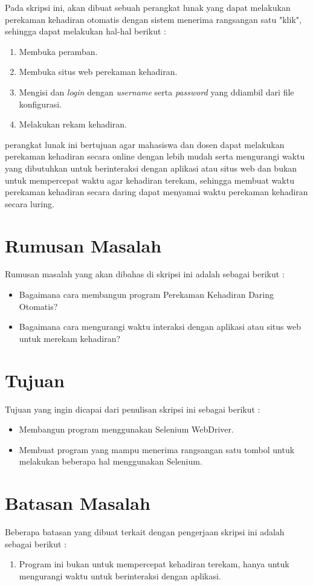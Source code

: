 Pada skripsi ini, akan dibuat sebuah perangkat lunak yang dapat melakukan perekaman kehadiran otomatis dengan sistem menerima rangsangan satu "klik", sehingga dapat melakukan hal-hal berikut :
\begin{enumerate}
	\item Membuka peramban.
	\item Membuka situs web perekaman kehadiran.
	\item Mengisi dan \textit{login} dengan \textit{username} serta \textit{password} yang ddiambil dari file konfigurasi.
	\item Melakukan rekam kehadiran.
\end{enumerate} 
perangkat lunak ini bertujuan agar mahasiswa dan dosen dapat melakukan perekaman kehadiran secara online dengan lebih mudah serta mengurangi waktu yang dibutuhkan untuk berinteraksi dengan aplikasi atau situs web dan bukan untuk mempercepat waktu agar kehadiran terekam, sehingga membuat waktu perekaman kehadiran secara daring dapat menyamai waktu perekaman kehadiran secara luring. 


\section{Rumusan Masalah}
\label{sec:rumusan}
Rumusan masalah yang akan dibahas di skripsi ini adalah sebagai berikut :
\begin{itemize}
	\item Bagaimana cara membangun program Perekaman Kehadiran Daring Otomatis?
	\item Bagaimana cara mengurangi waktu interaksi dengan aplikasi atau situs web untuk merekam kehadiran?
\end{itemize}

\section{Tujuan}
\label{sec:tujuan}
Tujuan yang ingin dicapai dari penulisan skripsi ini sebagai berikut :
\begin{itemize}
	\item Membangun program menggunakan Selenium WebDriver.
	\item Membuat program yang mampu menerima rangsangan satu tombol untuk melakukan beberapa hal menggunakan Selenium.
\end{itemize}

\section{Batasan Masalah}
\label{sec:batasan}
Beberapa batasan yang dibuat terkait dengan pengerjaan skripsi ini adalah sebagai berikut :
\begin{enumerate}
	\item Program ini bukan untuk mempercepat kehadiran terekam, hanya untuk mengurangi waktu untuk berinteraksi dengan aplikasi.
\end{enumerate}



